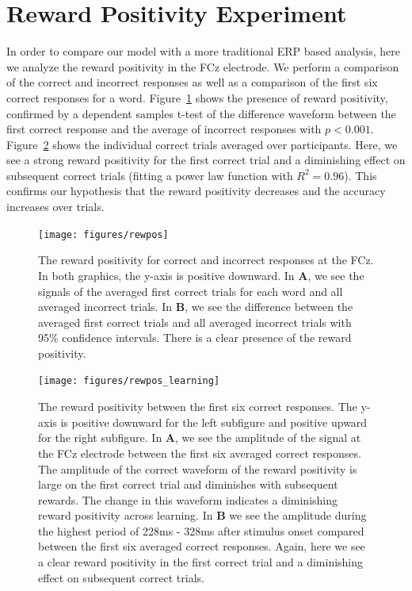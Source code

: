 \section{Reward Positivity Experiment} In order to compare our model with a 
more traditional ERP based analysis, here we analyze the reward positivity in 
the FCz electrode. We perform a comparison of the correct and incorrect 
responses as well as a comparison of the first six correct responses for a 
word.  Figure~\ref{fig:rewpos} shows the presence of reward positivity, 
confirmed by a dependent samples t-test of the difference waveform between the 
first correct response and the average of incorrect responses with $p < 0.001$.  
Figure~\ref{fig:rewpos_learning} shows the individual correct trials averaged 
over participants.  Here, we see a strong reward positivity for the first 
correct trial and a diminishing effect on subsequent correct trials (fitting a 
power law function with $R^2 = 0.96$). This confirms our hypothesis that the 
reward positivity decreases and the \tvt accuracy increases over trials.

\begin{figure}[t]
  \centerline{
    \texttt{[image: figures/rewpos]}
  }
  \caption{The reward positivity for correct and incorrect responses at the FCz. In both graphics, the y-axis is positive downward. In {\bf A}, we see the signals of the averaged first correct trials for each word and all averaged incorrect trials. In {\bf B}, we see the difference between the averaged first correct trials and all averaged incorrect trials with 95\% confidence intervals. There is a clear presence of the reward positivity.}
  \label{fig:rewpos}
\end{figure}

\begin{figure}[t]
  \centerline{
    \texttt{[image: figures/rewpos\_learning]}
  }
  \caption{The reward positivity between the first six correct responses. The y-axis is positive downward for the left subfigure and positive upward for the right subfigure. In {\bf A}, we see the amplitude of the signal at the FCz electrode between the first six averaged correct responses. The amplitude of the correct waveform of the reward positivity is large on the first correct trial and diminishes with subsequent rewards. The change in this waveform indicates a diminishing reward positivity across learning. In {\bf B} we see the amplitude during the highest period of 228ms - 328ms after stimulus onset compared between the first six averaged correct responses. Again, here we see a clear reward positivity in the first correct trial and a diminishing effect on subsequent correct trials.}
  \label{fig:rewpos_learning}
\end{figure}

